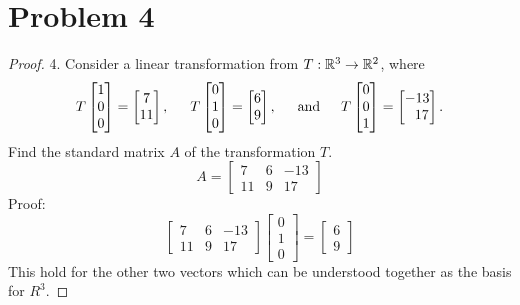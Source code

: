 \documentclass[12pt]{article}
\newcommand{\tab}{\\\\}
\newcommand{\sect}[1]{\section*{#1}}
\begin{document}
\sect{Problem 4}
\begin{proof}
  4. Consider a linear transformation from $T : {\Bbb R}^3 \rightarrow {\Bbb R}^2$, where
  \[
  T\begin{bmatrix} 1 \\ 0 \\ 0 \end{bmatrix} = \begin{bmatrix} 7 \\ 11 \end{bmatrix},\hskip 15pt T\begin{bmatrix} 0 \\ 1 \\ 0 \end{bmatrix} = \begin{bmatrix} 6 \\ 9 \end{bmatrix},\hskip 15pt \mbox{and} \hskip 15pt
  T\begin{bmatrix} 0 \\ 0 \\ 1 \end{bmatrix} = \begin{bmatrix} -13\\~~17\end{bmatrix}.
  \]
  Find the standard matrix $A$ of the transformation $T$.
  \[
    A=\begin{bmatrix}
      7&6&-13\\
      11&9&17
  \end{bmatrix}
  \]
  Proof:
  \[
  \begin{bmatrix}
    7&6&-13\\
    11&9&17
  \end{bmatrix}
  \begin{bmatrix}
  0\\1\\0
  \end{bmatrix}
  =\begin{bmatrix}
  6\\9
  \end{bmatrix}
  \]
  This hold for the other two vectors which can be understood together as the basis for $R^3$.
  \noindent
\end{proof}\tab\tab
\end{document}
